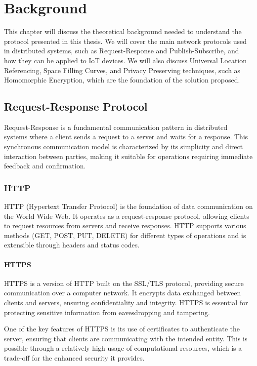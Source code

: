 \chapter{Background} \label{chap:background}

This chapter will discuss the theoretical background needed to understand the protocol presented in this thesis. We will cover the main network protocols used in distributed systems, such as Request-Response and Publish-Subscribe, and how they can be applied to IoT devices. We will also discuss Universal Location Referencing, Space Filling Curves, and Privacy Preserving techniques, such as Homomorphic Encryption, which are the foundation of the solution proposed.

\section{Request-Response Protocol}

Request-Response is a fundamental communication pattern in distributed systems where a client sends a request to a server and waits for a response. This synchronous communication model is characterized by its simplicity and direct interaction between parties, making it suitable for operations requiring immediate feedback and confirmation.

\subsection{HTTP}
HTTP (Hypertext Transfer Protocol) is the foundation of data communication on the World Wide Web. It operates as a request-response protocol, allowing clients to request resources from servers and receive responses. HTTP supports various methods (GET, POST, PUT, DELETE) for different types of operations and is extensible through headers and status codes.

\subsubsection{HTTPS}
HTTPS is a version of HTTP built on the SSL/TLS protocol, providing secure communication over a computer network. It encrypts data exchanged between clients and servers, ensuring confidentiality and integrity. HTTPS is essential for protecting sensitive information from eavesdropping and tampering.

One of the key features of HTTPS is its use of certificates to authenticate the server, ensuring that clients are communicating with the intended entity. This is possible through a relatively high usage of computational resources, which is a trade-off for the enhanced security it provides.


